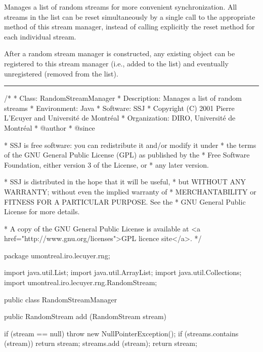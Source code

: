 
Manages a list of random streams for more convenient synchronization.
All streams in the list can be reset simultaneously by a single 
call to the appropriate method of this stream manager,
instead of calling explicitly the reset method for each 
individual stream.

After a random stream manager is constructed, any
existing  object can be registered
to this stream manager (i.e., added to the list)
and eventually unregistered (removed from the list).

\bigskip\hrule

\begin{code}
\begin{hide}
/*
 * Class:        RandomStreamManager
 * Description:  Manages a list of random streams
 * Environment:  Java
 * Software:     SSJ 
 * Copyright (C) 2001  Pierre L'Ecuyer and Université de Montréal
 * Organization: DIRO, Université de Montréal
 * @author       
 * @since

 * SSJ is free software: you can redistribute it and/or modify it under
 * the terms of the GNU General Public License (GPL) as published by the
 * Free Software Foundation, either version 3 of the License, or
 * any later version.

 * SSJ is distributed in the hope that it will be useful,
 * but WITHOUT ANY WARRANTY; without even the implied warranty of
 * MERCHANTABILITY or FITNESS FOR A PARTICULAR PURPOSE.  See the
 * GNU General Public License for more details.

 * A copy of the GNU General Public License is available at
   <a href="http://www.gnu.org/licenses">GPL licence site</a>.
 */
\end{hide}
package umontreal.iro.lecuyer.rng;\begin{hide}

import java.util.List;
import java.util.ArrayList;
import java.util.Collections;
import umontreal.iro.lecuyer.rng.RandomStream;
\end{hide}

public class RandomStreamManager\begin{hide} {
   private List streams = new ArrayList();
\end{hide}

   public RandomStream add (RandomStream stream)\begin{hide} {
      if (stream == null)
         throw new NullPointerException();
      if (streams.contains (stream))
         return stream;
      streams.add (stream);
      return stream;
   }\end{hide}
\end{code}
